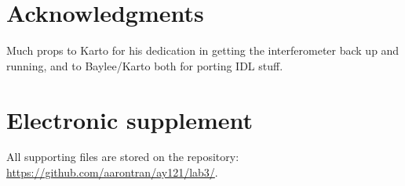\documentclass[10pt]{article}
\begin{document}
\section{Acknowledgments}

Much props to Karto for his dedication in getting the interferometer back up
and running, and to Baylee/Karto both for porting IDL stuff.

\section{Electronic supplement}

All supporting files are stored on the repository:\\
\href{https://github.com/aarontran/ay121}
{https://github.com/aarontran/ay121/lab3/}.
\end{document}
